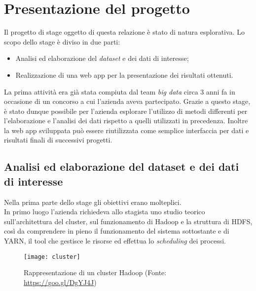 
\section{Presentazione del progetto}
Il progetto di stage oggetto di questa relazione è stato di natura esplorativa. Lo scopo dello stage è diviso in due parti:
\begin{itemize}
	\item Analisi ed elaborazione del \textit{dataset} e dei dati di interesse;
	\item Realizzazione di una \gls{web app} per la presentazione dei risultati ottenuti.
\end{itemize}
La prima attività era già stata compiuta dal team \textit{big data} circa 3 anni fa in occasione di un concorso a cui l'azienda aveva partecipato.
Grazie a questo stage, è stato dunque possibile per l'azienda esplorare l'utilizzo di metodi differenti per l'elaborazione e l'analisi dei dati rispetto a quelli utilizzati in precedenza. 
Inoltre la \gls{web app} sviluppata può essere riutilizzata come semplice interfaccia per dati e risultati finali di successivi progetti.
\subsection{Analisi ed elaborazione del dataset e dei dati di interesse}
Nella prima parte dello stage gli obiettivi erano molteplici. \\
In primo luogo l'azienda richiedeva allo stagista uno studio teorico sull'architettura del \gls{cluster}, sul funzionamento di Hadoop e la struttura di \gls{HDFS}, così da comprendere in pieno il funzionamento del sistema sottostante e di YARN, il tool che gestisce le risorse ed effettua lo \textit{scheduling} dei processi.
\clearpage
\begin{figure}[!h] 
	\centering 
	\texttt{[image: cluster]}
	\caption{Rappresentazione di un cluster Hadoop (Fonte: \href{https://goo.gl/DgYJ4J}{https://goo.gl/DgYJ4J})}
\end{figure}

